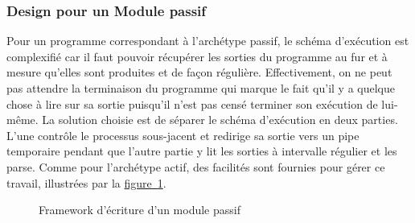 \documentclass[]{article}
\newcommand{\wordlink}[2]{\hyperref[#1]{#2~\ref{#1}}}
\begin{document}
\newpage

\subsubsection{Design pour un Module passif}

Pour un programme correspondant à l'archétype passif, le schéma d'exécution est complexifié car il faut pouvoir récupérer les sorties du programme au fur et à mesure qu'elles sont produites et de façon régulière. Effectivement, on ne peut pas attendre la terminaison du programme qui marque le fait qu'il y a quelque chose à lire sur sa sortie puisqu'il n'est pas censé terminer son exécution de lui-même. La solution choisie est de séparer le schéma d'exécution en deux parties. L'une contrôle le processus sous-jacent et redirige sa sortie vers un pipe temporaire pendant que l'autre partie y lit les sorties à intervalle régulier et les parse. Comme pour l'archétype actif, des facilités sont fournies pour gérer ce travail, illustrées par la \wordlink{abstrpassif}{figure}.

    \begin{figure}[!h]
       \noindent{}
       \caption{Framework d'écriture d'un module passif}
       \label{abstrpassif}
    \end{figure}
\end{document}
